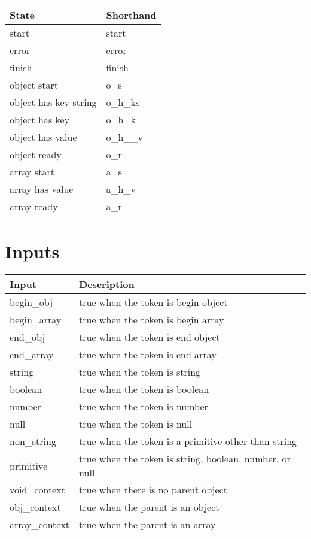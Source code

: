 \documentclass[11pt, letterpaper]{article}
\newcommand{\objectstart}{o\_s}
\newcommand{\arraystart}{a\_s}
\newcommand{\objecthaskeystring}{o\_h\_ks}
\newcommand{\objecthaskey}{o\_h\_k}
\newcommand{\objecthasvalue}{o\_h\_\_v}
\newcommand{\arrayhasvalue}{a\_h\_v}
\begin{document}
    \begin{tabu} to \linewidth{ X[l] | X[l] }
      \toprule[1pt]
      \textbf{State} & \textbf{Shorthand} \\ \midrule[1pt] 
      start & start \\ \hline
      error & error \\ \hline
      finish & finish \\ \hline
      object start & \objectstart \\ \hline
      object has key string & \objecthaskeystring \\ \hline
      object has key & \objecthaskey \\ \hline
      object has value & \objecthasvalue \\ \hline
      object ready & o\_r \\ \hline
      array start & \arraystart \\ \hline
      array has value & \arrayhasvalue \\ \hline
      array ready & a\_r \\ \bottomrule[1pt]
    \end{tabu}
  
  \section{Inputs}
  
    \begin{tabu} to \linewidth{ X[1,l] | X[3,l] }
      \toprule[1pt]
      \textbf{Input} & \textbf{Description} \\ \midrule[1pt] 
      begin\_obj & true when the token is begin object \\ \hline
      begin\_array & true when the token is begin array \\ \hline
      end\_obj & true when the token is end object \\ \hline
      end\_array & true when the token is end array \\ \hline
      string & true when the token is string \\ \hline
      boolean & true when the token is boolean \\ \hline
      number & true when the token is number \\ \hline
      null & true when the token is null \\ \hline
      non\_string & true when the token is a primitive other than string \\ \hline
      primitive & true when the token is string, boolean, number, or null \\ \hline
      void\_context & true when there is no parent object \\ \hline
      obj\_context & true when the parent is an object \\ \hline
      array\_context & true when the parent is an array \\ \bottomrule[1pt] 
    \end{tabu}
    
\end{document}
